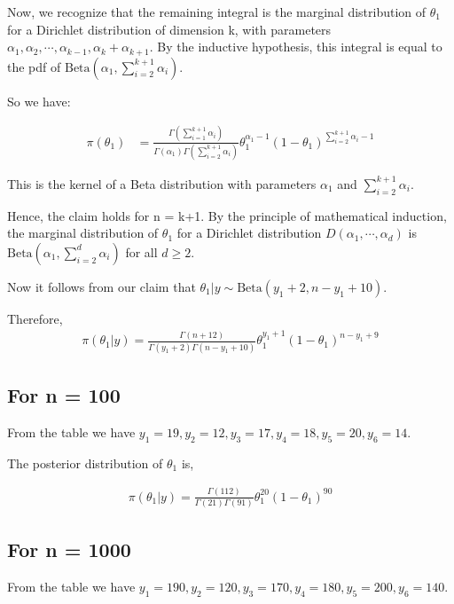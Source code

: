 \documentclass[a4paper]{article}
\begin{document}
Now, we recognize that the remaining integral is the marginal distribution of \(\theta_1\) for a Dirichlet distribution of dimension k, with parameters \(\alpha_1, \alpha_2, \cdots, \alpha_{k-1}, \alpha_k + \alpha_{k+1}\). By the inductive hypothesis, this integral is equal to the pdf of \(\text{Beta}\left(\alpha_1,\sum_{i=2}^{k+1}\alpha_i\right)\). 

So we have:

\begin{align*}
    \pi(\theta_1) &= \frac{\Gamma(\sum_{i=1}^{k+1} \alpha_i)}{\Gamma(\alpha_1) \Gamma(\sum_{i=2}^{k+1} \alpha_i)} \theta_1^{\alpha_1 - 1} (1 - \theta_1)^{\sum_{i=2}^{k+1} \alpha_i - 1}
\end{align*}

This is the kernel of a Beta distribution with parameters \(\alpha_1\) and \(\sum_{i=2}^{k+1} \alpha_i\).

Hence, the claim holds for n = k+1. By the principle of mathematical induction, the marginal distribution of \(\theta_1\) for a Dirichlet distribution \(D(\alpha_1, \cdots, \alpha_d)\) is \(\text{Beta}(\alpha_1, \sum_{i=2}^{d} \alpha_i)\) for all \(d \geq 2\).

\vspace{0.5cm}

Now it follows from our claim that \(\theta_1|y \sim \text{Beta}(y_1+2, n - y_1 + 10)\).

Therefore,
\begin{align*}
    \pi(\theta_1|y) = \frac{\Gamma(n+12)}{\Gamma(y_1+2)\Gamma(n-y_1+10)}\theta_1^{y_1+1}(1-\theta_1)^{n-y_1+9}
\end{align*}

\subsection*{For n = 100}
From the table we have \(y_1 = 19, y_2 = 12, y_3 = 17, y_4 = 18, y_5 = 20, y_6 =14 \).

The posterior distribution of \(\theta_1\) is,

\begin{align*}
    \pi(\theta_1|y) = \frac{\Gamma(112)}{\Gamma(21)\Gamma(91)}\theta_1^{20}(1-\theta_1)^{90}
\end{align*}

\subsection*{For n = 1000}
From the table we have \(y_1 = 190, y_2 = 120, y_3 = 170, y_4 = 180, y_5 = 200, y_6 =140 \).
\end{document}
